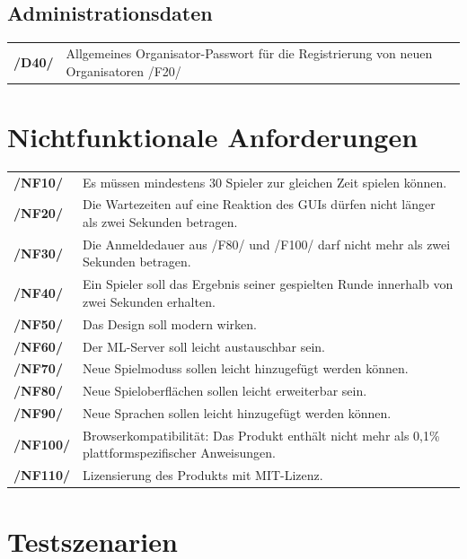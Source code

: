 \documentclass[a4paper]{scrreprt}
\begin{document}
    \section{Administrationsdaten}
    \begin{tabularx}{\linewidth}{@{}>{\bfseries}l@{\hspace{.5em}}X@{}}
        /D40/ & Allgemeines Organisator-Passwort für die Registrierung von neuen Organisatoren /F20/
    \end{tabularx}

    \chapter{Nichtfunktionale Anforderungen}

    \begin{tabularx}{\linewidth}{@{}>{\bfseries}l@{\hspace{.5em}}X@{}}
        /NF10/ & Es müssen mindestens 30 \Gls{Spieler} zur gleichen Zeit spielen können.\\
        /NF20/ & Die Wartezeiten auf eine Reaktion des GUIs dürfen nicht länger als zwei Sekunden betragen. \\
	    /NF30/ & Die Anmeldedauer aus /F80/ und /F100/ darf nicht mehr als zwei Sekunden betragen. \\
        /NF40/ & Ein \Gls{Spieler} soll das Ergebnis seiner gespielten Runde innerhalb von zwei Sekunden erhalten. \\
        /NF50/ & Das Design soll modern wirken. \\
        /NF60/ & Der \Gls{ML-Server} soll leicht austauschbar sein. \\
        /NF70/ & Neue \Glspl{Spielmodus} sollen leicht hinzugefügt werden können. \\
        /NF80/ & Neue Spieloberflächen sollen leicht erweiterbar sein. \\
        /NF90/ & Neue Sprachen sollen leicht hinzugefügt werden können. \\
        /NF100/ & Browserkompatibilität: Das Produkt enthält nicht mehr als 0,1\% plattformspezifischer Anweisungen. \\
        /NF110/ & Lizensierung des \Gls{Produkt}s mit MIT-Lizenz.
    \end{tabularx}

    \chapter{Testszenarien}
\end{document}
